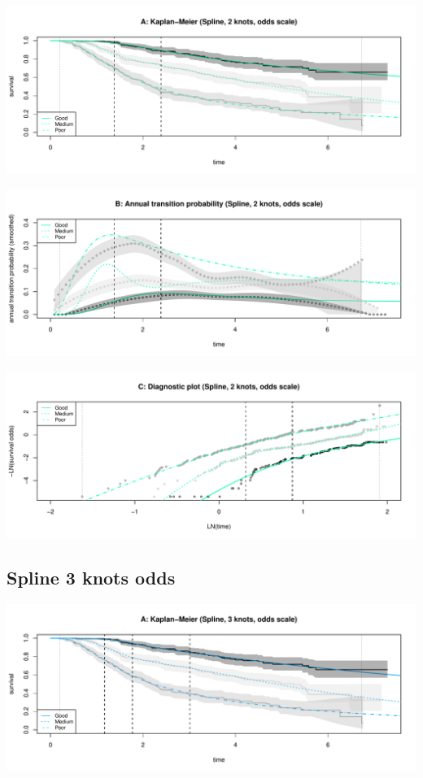 \documentclass[
]{article}
\begin{document}
\begin{flushleft}\includegraphics[height=0.25\textheight]{Images/spline_odds2-1} \end{flushleft}

\begin{flushleft}\includegraphics[height=0.25\textheight]{Images/spline_odds2-2} \end{flushleft}

\begin{flushleft}\includegraphics[height=0.25\textheight]{Images/spline_odds2-3} \end{flushleft}

\hypertarget{spline-3-knots-odds}{%
\subsection{Spline 3 knots odds}\label{spline-3-knots-odds}}

\begin{flushleft}\includegraphics[height=0.25\textheight]{Images/spline_odds3-1} \end{flushleft}
\end{document}
